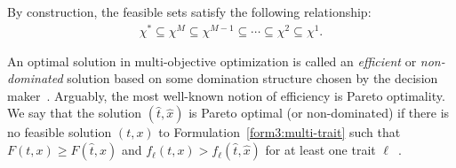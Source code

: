 \documentclass[12pt, a4paper, bibliography=totoc]{scrartcl}
\newtheorem{definition}{Definition}
\begin{document}
By construction, the feasible sets satisfy the following relationship:
\begin{align} \label{eq.P_subsets}
    \chi^*\subseteq \chi^M\subseteq \chi^{M-1}\subseteq \cdots \subseteq \chi^2 \subseteq \chi^1.
\end{align}
 



An optimal solution in multi-objective optimization is called an \textit{efficient} or \textit{non-dominated} solution based on some domination structure chosen by the decision maker~\citep{sawaragi1985theory}. Arguably, the most well-known notion of efficiency is Pareto optimality. We say that the solution $(\hat t, \hat x)$ is Pareto optimal (or non-dominated) if there is no feasible solution $(t,x)$ to  Formulation~\eqref{form3:multi-trait} such that $F(t,x) \ge F(\hat t, \hat x)$ and $f_\ell(t,x) > f_\ell(\hat t, \hat x)$ for at least one trait $\ell$~\citep{Miettinen2016}.

\end{document}
